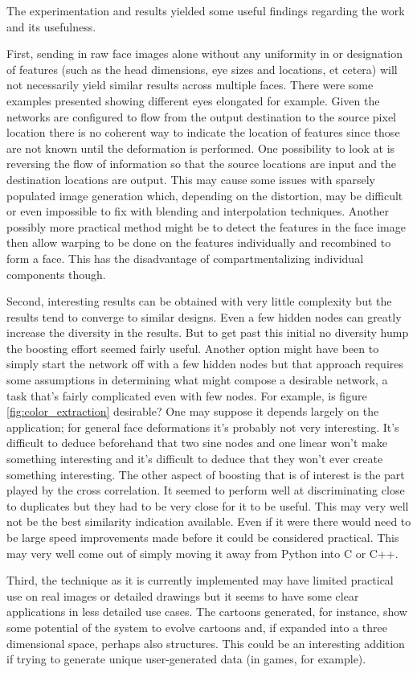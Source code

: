 The experimentation and results yielded some useful findings regarding the work and its usefulness.

First, sending in raw face images alone without any uniformity in or designation of features (such as the head dimensions, eye sizes and locations, et cetera) will not necessarily yield similar results across multiple faces. There were some examples presented showing different eyes elongated for example. Given the networks are configured to flow from the output destination to the source pixel location there is no coherent way to indicate the location of features since those are not known until the deformation is performed. One possibility to look at is reversing the flow of information so that the source locations are input and the destination locations are output. This may cause some issues with sparsely populated image generation which, depending on the distortion, may be difficult or even impossible to fix with blending and interpolation techniques. Another possibly more practical method might be to detect the features in the face image then allow warping to be done on the features individually and recombined to form a face. This has the disadvantage of compartmentalizing individual components though.

Second, interesting results can be obtained with very little complexity but the results tend to converge to similar designs. Even a few hidden nodes can greatly increase the diversity in the results. But to get past this initial no diversity hump the boosting effort seemed fairly useful. Another option might have been to simply start the network off with a few hidden nodes but that approach requires some assumptions in determining what might compose a desirable network, a task that's fairly complicated even with few nodes. For example, is figure \ref{fig:color_extraction} desirable? One may suppose it depends largely on the application; for general face deformations it's probably not very interesting. It's difficult to deduce beforehand that two sine nodes and one linear won't make something interesting and it's difficult to deduce that they won't ever create something interesting. The other aspect of boosting that is of interest is the part played by the cross correlation. It seemed to perform well at discriminating close to duplicates but they had to be very close for it to be useful. This may very well not be the best similarity indication available. Even if it were there would need to be large speed improvements made before it could be considered practical. This may very well come out of simply moving it away from Python into C or C++.

Third, the technique as it is currently implemented may have limited practical use on real images or detailed drawings but it seems to have some clear applications in less detailed use cases. The cartoons generated, for instance, show some potential of the system to evolve cartoons and, if expanded into a three dimensional space, perhaps also structures. This could be an interesting addition if trying to generate unique user-generated data (in games, for example).